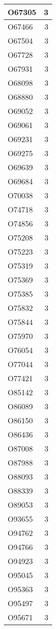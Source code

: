 \documentclass[
]{book}
\theoremstyle{definition}
\theoremstyle{definition}
\theoremstyle{definition}
\theoremstyle{definition}
\theoremstyle{remark}
\begin{document}
\begin{table}
\begin{tabular}{l|r}
\hline
O67305 & 3\\
\hline
O67466 & 3\\
\hline
O67504 & 3\\
\hline
O67728 & 3\\
\hline
O67931 & 3\\
\hline
O68098 & 3\\
\hline
O68880 & 3\\
\hline
O69052 & 3\\
\hline
O69061 & 3\\
\hline
O69231 & 3\\
\hline
O69275 & 3\\
\hline
O69639 & 3\\
\hline
O69684 & 3\\
\hline
O70038 & 3\\
\hline
O74718 & 3\\
\hline
O74856 & 3\\
\hline
O75208 & 3\\
\hline
O75223 & 3\\
\hline
O75319 & 3\\
\hline
O75369 & 3\\
\hline
O75385 & 3\\
\hline
O75832 & 3\\
\hline
O75844 & 3\\
\hline
O75970 & 3\\
\hline
O76054 & 3\\
\hline
O77044 & 3\\
\hline
O77421 & 3\\
\hline
O85142 & 3\\
\hline
O86089 & 3\\
\hline
O86150 & 3\\
\hline
O86436 & 3\\
\hline
O87008 & 3\\
\hline
O87988 & 3\\
\hline
O88093 & 3\\
\hline
O88339 & 3\\
\hline
O89053 & 3\\
\hline
O93655 & 3\\
\hline
O94762 & 3\\
\hline
O94766 & 3\\
\hline
O94923 & 3\\
\hline
O95045 & 3\\
\hline
O95363 & 3\\
\hline
O95497 & 3\\
\hline
O95671 & 3\\

\end{tabular}
\end{table}
\end{document}
